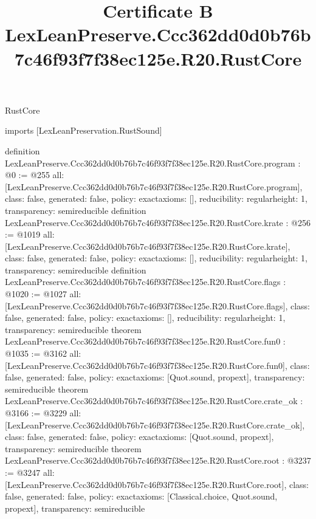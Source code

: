 \begin{lexlean}{RustCore}
\title{Certificate B LexLeanPreserve.Ccc362dd0d0b76b7c46f93f7f38ec125e.R20.RustCore}
\begin{coremodule}
imports [LexLeanPreservation.RustSound]

definition LexLeanPreserve.Ccc362dd0d0b76b7c46f93f7f38ec125e.R20.RustCore.program : @0 := @255 {
  all: [LexLeanPreserve.Ccc362dd0d0b76b7c46f93f7f38ec125e.R20.RustCore.program],
  class: false,
  generated: false,
  policy: exact{axioms: []},
  reducibility: regular{height: 1},
  transparency: semireducible
}
definition LexLeanPreserve.Ccc362dd0d0b76b7c46f93f7f38ec125e.R20.RustCore.krate : @256 := @1019 {
  all: [LexLeanPreserve.Ccc362dd0d0b76b7c46f93f7f38ec125e.R20.RustCore.krate],
  class: false,
  generated: false,
  policy: exact{axioms: []},
  reducibility: regular{height: 1},
  transparency: semireducible
}
definition LexLeanPreserve.Ccc362dd0d0b76b7c46f93f7f38ec125e.R20.RustCore.flags : @1020 := @1027 {
  all: [LexLeanPreserve.Ccc362dd0d0b76b7c46f93f7f38ec125e.R20.RustCore.flags],
  class: false,
  generated: false,
  policy: exact{axioms: []},
  reducibility: regular{height: 1},
  transparency: semireducible
}
theorem LexLeanPreserve.Ccc362dd0d0b76b7c46f93f7f38ec125e.R20.RustCore.fun0 : @1035 := @3162 {
  all: [LexLeanPreserve.Ccc362dd0d0b76b7c46f93f7f38ec125e.R20.RustCore.fun0],
  class: false,
  generated: false,
  policy: exact{axioms: [Quot.sound, propext]},
  transparency: semireducible
}
theorem LexLeanPreserve.Ccc362dd0d0b76b7c46f93f7f38ec125e.R20.RustCore.crate_ok : @3166 := @3229 {
  all: [LexLeanPreserve.Ccc362dd0d0b76b7c46f93f7f38ec125e.R20.RustCore.crate_ok],
  class: false,
  generated: false,
  policy: exact{axioms: [Quot.sound, propext]},
  transparency: semireducible
}
theorem LexLeanPreserve.Ccc362dd0d0b76b7c46f93f7f38ec125e.R20.RustCore.root : @3237 := @3247 {
  all: [LexLeanPreserve.Ccc362dd0d0b76b7c46f93f7f38ec125e.R20.RustCore.root],
  class: false,
  generated: false,
  policy: exact{axioms: [Classical.choice, Quot.sound, propext]},
  transparency: semireducible
}


\end{coremodule}
\end{lexlean}
